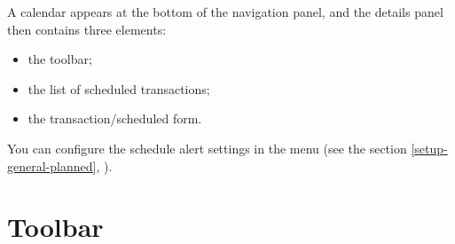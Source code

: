 A calendar appears at the bottom of the navigation panel, and the details panel then contains three elements:
\begin{itemize}
	\item the toolbar;
	\item the list of scheduled transactions;
	\item the transaction/scheduled form.
\end{itemize}

You can configure the schedule alert settings in the menu  (see the section \vref{setup-general-planned}, ).


\section{Toolbar\label{plannedtransactions-functions}}

